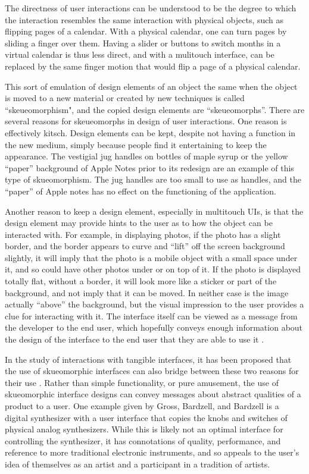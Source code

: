 The directness of user interactions can be understood to be the degree to which the interaction resembles the same interaction with physical objects, such as flipping pages of a calendar. 
With a physical calendar, one can turn pages by sliding a finger over them. 
Having a slider or buttons to switch months in a virtual calendar is thus less direct, and with a mulitouch interface, can be replaced by the same finger motion that would flip a page of a physical calendar.

This sort of emulation of design elements of an object the same when the object is moved to a new material or created by new techniques is called ``skeueomorphism", and the copied design elements are ``skeueomorphs''. 
There are several reasons for skeueomorphs in design of user interactions. 
One reason is effectively kitsch. 
Design elements can be kept, despite not having a function in the new medium, simply because people find it entertaining to keep the appearance.
The vestigial jug handles on bottles of maple syrup or the yellow ``paper'' background of Apple Notes prior to its redesign are an example of this type of skueomorphism.
The jug handles are too small to use as handles, and the ``paper'' of Apple notes has no effect on the functioning of the application. 

Another reason to keep a design element, especially in multitouch UIs, is that the design element may provide hints to the user as to how the object can be interacted with. 
For example, in displaying photos, if the photo has a slight border, and the border appears to curve and ``lift'' off the screen background slightly, it will imply that the photo is a mobile object with a small space under it, and so could have other photos under or on top of it. 
If the photo is displayed totally flat, without a border, it will look more like a sticker or part of the background, and not imply that it can be moved. 
In neither case is the image actually ``above'' the background, but the visual impression to the user provides a clue for interacting with it. 
The interface itself can be viewed as a message from the developer to the end user, which hopefully conveys enough information about the design of the interface to the end user that they are able to use it \citep{derboven2012semiotic}. 

In the study of interactions with tangible interfaces, it has been proposed that the use of skueomorphic interfaces can also bridge between these two reasons for their use \citep{gross2014skeu}.
Rather than simple functionality, or pure amusement, the use of skueomorphic interface designs can convey messages about abstract qualities of a product to a user. 
One example given by Gross, Bardzell, and Bardzell is a digital synthesizer with a user interface that copies the knobs and switches of physical analog synthesizers. 
While this is likely not an optimal interface for controlling the synthesizer, it has connotations of quality, performance, and reference to more traditional electronic instruments, and so appeals to the user's idea of themselves as an artist and a participant in a tradition of artists. 

